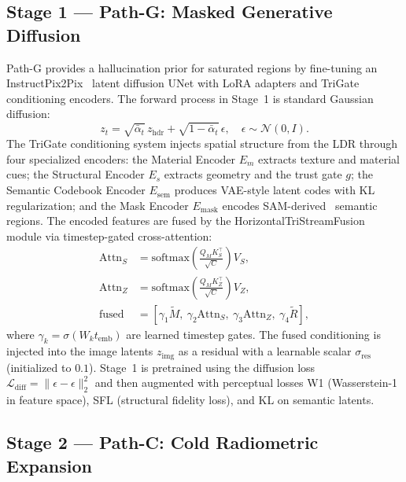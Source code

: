 \documentclass[10pt,twocolumn,letterpaper]{article}
\begin{document}
\subsection{Stage 1 --- Path-G: Masked Generative Diffusion}

Path-G provides a hallucination prior for saturated regions by fine-tuning an InstructPix2Pix~\cite{instructpix2pix} latent diffusion UNet with LoRA adapters and TriGate conditioning encoders. The forward process in Stage~1 is standard Gaussian diffusion:
\begin{equation}
z_t = \sqrt{\bar\alpha_t}\, z_{\mathrm{hdr}} + \sqrt{1-\bar\alpha_t}\,\epsilon, \quad \epsilon \sim \mathcal{N}(0,I).
\label{eq:gaussian-fwd}
\end{equation}
The TriGate conditioning system injects spatial structure from the LDR through four specialized encoders: the Material Encoder $E_m$ extracts texture and material cues; the Structural Encoder $E_s$ extracts geometry and the trust gate $g$; the Semantic Codebook Encoder $E_{\mathrm{sem}}$ produces VAE-style latent codes with KL regularization; and the Mask Encoder $E_{\mathrm{mask}}$ encodes SAM-derived~\cite{sam} semantic regions. The encoded features are fused by the HorizontalTriStreamFusion module via timestep-gated cross-attention:
\begin{align}
\mathrm{Attn}_S &= \mathrm{softmax}\!\left(\frac{Q_M K_S^\top}{\sqrt{C}}\right) V_S, \\
\mathrm{Attn}_Z &= \mathrm{softmax}\!\left(\frac{Q_M K_Z^\top}{\sqrt{C}}\right) V_Z, \\
\mathrm{fused} &= [\gamma_1 \tilde M,\ \gamma_2 \mathrm{Attn}_S,\ \gamma_3 \mathrm{Attn}_Z,\ \gamma_4 \tilde R],
\label{eq:tristream}
\end{align}
where $\gamma_k = \sigma(W_k t_{\mathrm{emb}})$ are learned timestep gates. The fused conditioning is injected into the image latents $z_{\mathrm{img}}$ as a residual with a learnable scalar $\sigma_{\mathrm{res}}$ (initialized to $0.1$). Stage~1 is pretrained using the diffusion loss $\mathcal{L}_{\mathrm{diff}} = \|\hat\epsilon - \epsilon\|_2^2$ and then augmented with perceptual losses W1 (Wasserstein-1 in feature space), SFL (structural fidelity loss), and KL on semantic latents.

\subsection{Stage 2 --- Path-C: Cold Radiometric Expansion}
\end{document}
